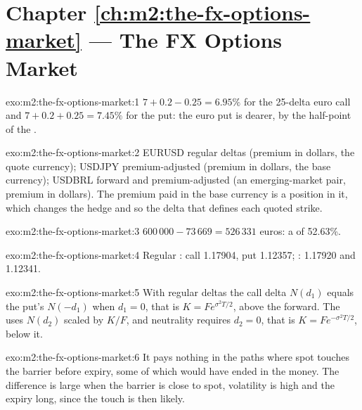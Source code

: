 \section*{Chapter \ref{ch:m2:the-fx-options-market} --- The FX Options Market}

\begin{solution}{exo:m2:the-fx-options-market:1}
$7 + 0.2 - 0.25 = 6.95\%$ for the 25-delta euro call and $7 + 0.2 + 0.25 = 7.45\%$ for
the put: the euro put is dearer, by the half-point of the .
\end{solution}

\begin{solution}{exo:m2:the-fx-options-market:2}
EURUSD regular deltas (premium in dollars, the quote currency); USDJPY
premium-adjusted (premium in dollars, the base currency); USDBRL forward and
premium-adjusted (an emerging-market pair, premium in dollars). The premium paid
in the base currency is a position in it, which changes the hedge and so the
delta that defines each quoted strike.
\end{solution}

\begin{solution}{exo:m2:the-fx-options-market:3}
$600\,000 - 73\,669 = 526\,331$ euros: a  of 52.63\%.
\end{solution}

\begin{solution}{exo:m2:the-fx-options-market:4}
Regular : call 1.17904, put 1.12357; : 1.17920 and
1.12341.
\end{solution}

\begin{solution}{exo:m2:the-fx-options-market:5}
With regular deltas the call delta $N(d_1)$ equals the put's $N(-d_1)$ when
$d_1 = 0$, that is $K = Fe^{\sigma^2T/2}$, above the forward. The  uses $N(d_2)$ scaled by $K/F$, and neutrality requires $d_2 = 0$, that is
$K = Fe^{-\sigma^2T/2}$, below it.
\end{solution}

\begin{solution}{exo:m2:the-fx-options-market:6}
It pays nothing in the paths where spot touches the barrier before expiry, some
of which would have ended in the money. The difference is large when the barrier
is close to spot, volatility is high and the expiry long, since the touch is
then likely.
\end{solution}

